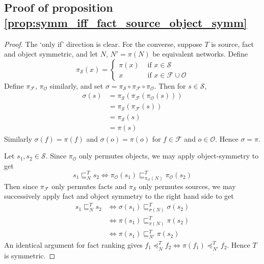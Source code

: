 \documentclass{article}
\theoremstyle{definition} \newtheorem{definition}{Definition}
\theoremstyle{definition} \newtheorem{example}{Example}
\theoremstyle{plain} \newtheorem{axiom}{Axiom}
\theoremstyle{plain} \newtheorem*{remark}{Remark}
\theoremstyle{remark} \newtheorem*{notation}{Notation}
\theoremstyle{plain} \newtheorem{lemma}{Lemma}
\theoremstyle{plain} \newtheorem{theorem}{Theorem}
\theoremstyle{plain} \newtheorem{proposition}{Proposition}
\renewcommand{\S}{\mathcal{S}}  %
\renewcommand{\O}{\mathcal{O}}  %
\newcommand{\F}{\mathcal{F}}
\newcommand{\sle}{\sqsubseteq}
\newcommand{\fle}{\preceq}
\begin{document}
\subsection{Proof of proposition \ref{prop:symm_iff_fact_source_object_symm}}
\begin{proof}

The `only if' direction is clear. For the converse, suppose $T$ is source, fact
and object symmetric, and let $N$, $N'=\pi(N)$ be equivalent networks. Define
\begin{equation*}
\pi_\S(x) = \begin{cases}
    \pi(x) & \text{ if } x \in \S \\
    x      & \text{ if } x \in \F \cup \O
\end{cases}
\end{equation*}
Define $\pi_\F$, $\pi_\O$ similarly, and set $\sigma = \pi_\S \circ \pi_\F
\circ \pi_\O$. Then for $s \in \S$,
\begin{align*}
\sigma(s) &= \pi_\S(\pi_\F(\pi_\O(s))) \\
          &= \pi_\S(\pi_\F(s)) \\
          &= \pi_\S(s) \\
          &= \pi(s)
\end{align*}
Similarly $\sigma(f)=\pi(f)$ and $\sigma(o)=\pi(o)$ for $f \in \F$ and $o \in
\O$. Hence $\sigma=\pi$.

Let $s_1, s_2 \in \S$. Since $\pi_\O$ only permutes objects, we may apply
object-symmetry to get
$$ s_1 \sle_N^T s_2 \iff \pi_\O(s_1) \sle_{\pi_\O(N)}^T \pi_\O(s_2) $$
Then since $\pi_\F$ only permutes facts and $\pi_\S$ only permutes sources, we
may successively apply fact and object symmetry to the right hand side to get
\begin{align*}
s_1 \sle_N^T s_2 & \iff \sigma(s_1) \sle_{\sigma(N)}^T \sigma(s_2) \\
                 & \iff \pi(s_1) \sle_{\pi(N)}^T \pi(s_2) \\
                 & \iff \pi(s_1) \sle_{N'}^T \pi(s_2)
\end{align*}
An identical argument for fact ranking gives $f_1 \fle_N^T f_2 \iff \pi(f_1)
\fle_{N'}^T f_2$. Hence $T$ is symmetric.

\end{proof}
\end{document}

